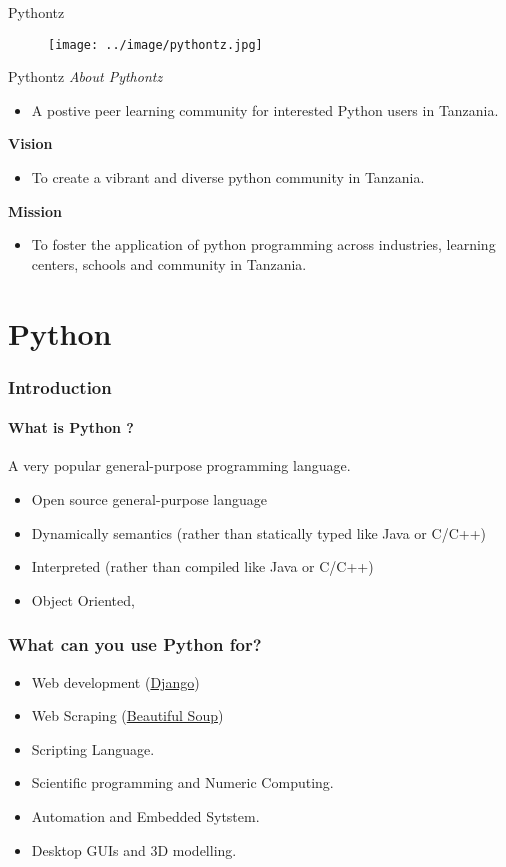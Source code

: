 \documentclass{bredelebeamer}
\begin{document}
\begin{frame}{Pythontz}
\begin{figure}
\centering
\texttt{[image: ../image/pythontz.jpg]}
\end{figure}
\end{frame}


\begin{frame}{Pythontz}
\emph{About Pythontz}
\begin{itemize}
	\item A postive peer learning community for interested Python users in Tanzania.
\end{itemize}
\textbf{Vision}
\begin{itemize}
	\item To create a vibrant and diverse python community in Tanzania.
\end{itemize}
\textbf{Mission}
\begin{itemize}
	\item To foster the application of python programming across industries, learning centers, schools and community in Tanzania.
\end{itemize}
\end{frame}
\section{Python}

\begin{frame}\frametitle{Introduction}
\framesubtitle{What is Python ?}
A very popular general-purpose programming language.
\begin{itemize}
\item Open source general-purpose language
\item Dynamically semantics (rather than statically typed like Java or C/C++)
\item Interpreted (rather than compiled like Java or C/C++)
\item Object Oriented, 
\end{itemize}
\end{frame}	

\begin{frame}\frametitle{What can you use Python for?}

\begin{itemize}
\item Web development (\href{https://www.djangoproject.com/}{Django})
\item Web Scraping (\href{https://www.djangoproject.com/}{Beautiful Soup})
\item Scripting Language.
\item Scientific programming and Numeric Computing.
\item Automation and Embedded Sytstem.
\item Desktop GUIs and 3D modelling. 
\end{itemize}
\end{frame}	
	
\end{document}
